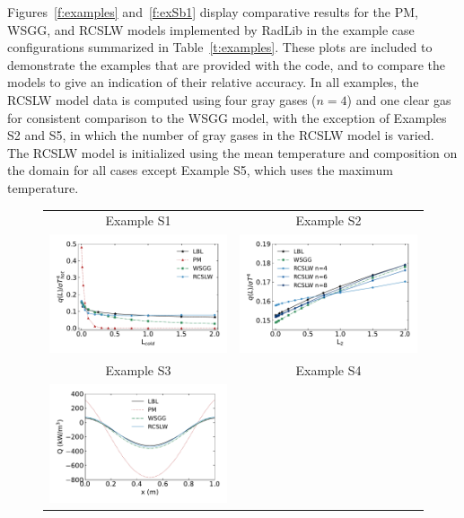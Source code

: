 \documentclass[preprint,12pt]{elsarticle}
\begin{document}
    Figures~\ref{f:examples} and~\ref{f:exSb1} display comparative results for the PM, WSGG, and RCSLW models
    implemented by RadLib in the example case configurations summarized in Table~\ref{t:examples}. These plots are
    included to demonstrate the examples that are provided with the code, and to compare the models to give an
    indication of their relative accuracy. In all examples, the RCSLW model data is computed using four gray gases
    ($n=4$) and one clear gas for consistent comparison to the WSGG model, with the exception of Examples S2 and S5, in
    which
    the number of gray gases in the RCSLW model is varied. The RCSLW model is initialized using the mean temperature
    and composition on the domain for all cases except Example S5, which uses the maximum temperature.
%
    \begin{figure}
        \begin{center}
            \begin{tabular}{c c}
                Example S1                                      & Example S2 \\
                \includegraphics[width=2.75 in]{fig_ex_S1.pdf} &
                \includegraphics[width=2.75 in]{fig_ex_S2b.pdf} \\
                Example S3                                      & Example S4 \\
                \includegraphics[width=2.75 in]{fig_ex_S3a.pdf} &

\end{tabular}
\end{center}
\end{figure}
\end{document}

